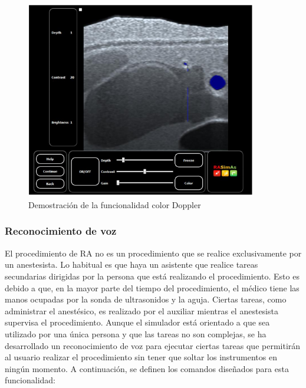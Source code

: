 \begin{figure}[h]
    \centering
    \includegraphics[width=0.9\textwidth]{IMG/uscolor.PNG}
    \caption{Demostración de la funcionalidad color Doppler}
    \label{fig:doppler}
\end{figure}
 
\subsubsection{Reconocimiento de voz}

El procedimiento de \ac{RA} no es un procedimiento que se realice exclusivamente por un anestesista. Lo habitual es que haya un asistente que  realice tareas secundarias dirigidas por la persona que está realizando el procedimiento. Esto es debido a que, en la mayor parte del tiempo del procedimiento, el médico tiene las manos ocupadas por la sonda de ultrasonidos y la aguja. Ciertas tareas, como administrar el anestésico, es realizado por el auxiliar mientras el anestesista supervisa el procedimiento. Aunque el simulador está orientado a que sea utilizado por una única persona y que las tareas no son complejas, se ha desarrollado un reconocimiento de voz para ejecutar ciertas tareas que permitirán al usuario realizar el procedimiento sin tener que soltar los instrumentos en ningún momento. A continuación, se definen los comandos diseñados para esta funcionalidad:


